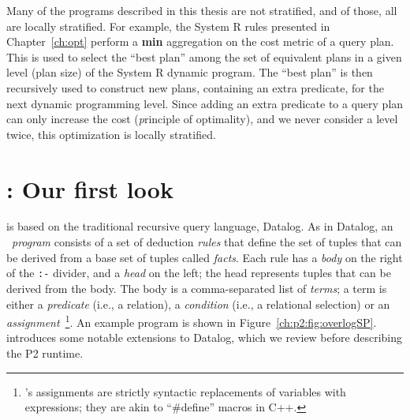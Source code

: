 Many of the programs described in this thesis are not stratified, and of those,
all are locally stratified.  For example, the System R rules presented in
Chapter~\ref{ch:opt} perform a {\bf min} aggregation on the cost metric of a
query plan.  This is used to select the ``best plan'' among the set of
equivalent plans in a given level (plan size) of the System R dynamic program.
The ``best plan'' is then recursively used to construct new plans, containing
an extra predicate, for the next dynamic programming level.  Since adding an
extra predicate to a query plan can only increase the cost ({\emph principle of
optimality}), and we never consider a level twice, this optimization is locally
stratified.


\section{\OVERLOG: Our first look}
\label{ch:p2:sec:overlog}

\OVERLOG is based on the traditional recursive query language, Datalog.  As in
Datalog, an \OVERLOG~{\em program} consists of a set of deduction {\em rules}
that define the set of tuples that can be derived from a base set of tuples
called {\em facts}.  Each rule has a {\em body} on the right of the \texttt{:-}
divider, and a {\em head} on the left; the head represents tuples that can be
derived from the body.  The body is a comma-separated list of {\em terms}; a
term is either a {\em predicate} (i.e., a relation), a {\em condition} (i.e., a
relational selection) or an {\em assignment}~\footnote{\OVERLOG's assignments
are strictly syntactic replacements of variables with expressions; they are
akin to ``\#define'' macros in C++.}.  An example \OVERLOG program is shown in
Figure~\ref{ch:p2:fig:overlogSP}.  \OVERLOG introduces some notable extensions
to Datalog, which we review before describing the P2 runtime.

